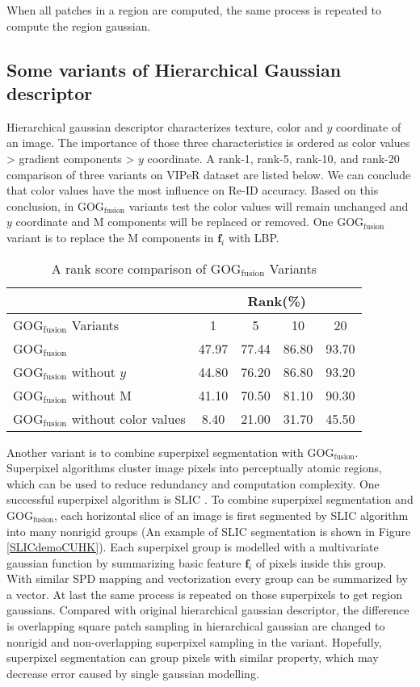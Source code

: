 When all patches in a region are computed, the same process is repeated to compute the region gaussian. 
\subsection{Some variants of Hierarchical Gaussian descriptor}
Hierarchical gaussian descriptor characterizes texture, color and $y$ coordinate of an image. The importance of those three characteristics is ordered as color values > gradient components > $y$ coordinate. A rank-1, rank-5, rank-10, and rank-20 comparison of three variants on VIPeR dataset are listed below. We can conclude that color values have the most influence on Re-ID accuracy. Based on this conclusion, in GOG$_\text{fusion}$ variants test the color values will remain unchanged and $y$ coordinate and M components will be replaced or removed. One GOG$_\text{fusion}$ variant is to replace the M components in $\bm{f}_i$ with LBP. 

\begin{table}[H]
\centering
\caption{A rank score comparison of GOG$_\text{fusion}$ Variants}
\begin{tabular}{|l|c|c|c|c|}
\hline
 & \multicolumn{4}{|c|}{Rank(\%)}\\
\hline
GOG$_\text{fusion}$ Variants & 1 & 5 & 10 & 20 \\ 
\hline
GOG$_\text{fusion}$ &47.97 &77.44 & 86.80& 93.70\\
\hline
GOG$_\text{fusion}$ without $y$ & 44.80&  76.20& 86.80& 93.20\\
\hline
GOG$_\text{fusion}$ without M & 41.10&70.50&81.10&90.30\\
\hline
GOG$_\text{fusion}$ without color values & 8.40 &21.00&31.70& 45.50\\
\hline
\end{tabular}
\end{table}

Another variant is to combine superpixel segmentation with GOG$_\text{fusion}$. Superpixel algorithms cluster image pixels into perceptually atomic regions, which can be used to reduce redundancy and computation complexity. One successful superpixel algorithm is SLIC \cite{SLIC}. To combine superpixel segmentation and GOG$_\text{fusion}$, each horizontal slice of an image is first segmented by SLIC algorithm into many nonrigid groups (An example of SLIC segmentation is shown in Figure \ref{SLICdemoCUHK}). Each superpixel group is modelled with a multivariate gaussian function by summarizing basic feature $\bm{f}_i$ of pixels inside this group. With similar SPD mapping and vectorization every group can be summarized by a vector. At last the same process is repeated on those superpixels to get region gaussians. Compared with original hierarchical gaussian descriptor, the difference is overlapping square patch sampling in hierarchical gaussian are changed to nonrigid and non-overlapping superpixel sampling in the variant. Hopefully, superpixel segmentation can group pixels with similar property, which may decrease error caused by single gaussian modelling. 

